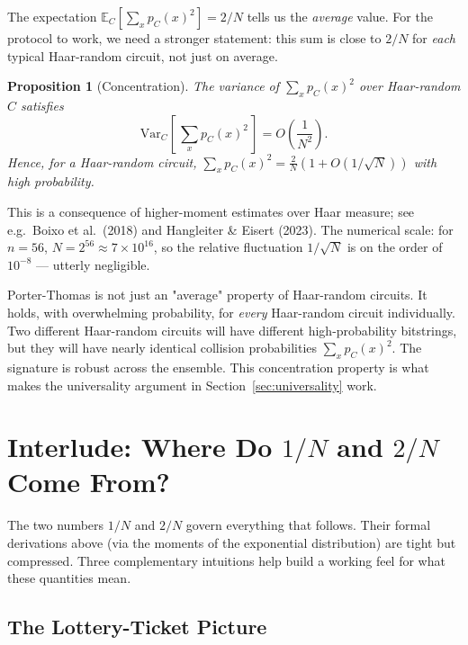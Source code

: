 \documentclass[11pt]{article}
\theoremstyle{plain}
\newtheorem{proposition}[theorem]{Proposition}
\theoremstyle{definition}
\newcommand{\E}{\mathbb{E}}
\newcommand{\Var}{\mathrm{Var}}
\begin{document}
The expectation $\E_C[\sum_x p_C(x)^2] = 2/N$ tells us the \emph{average} value. For the protocol to work, we need a stronger statement: this sum is close to $2/N$ for \emph{each} typical Haar-random circuit, not just on average.

\begin{proposition}[Concentration]
The variance of $\sum_x p_C(x)^2$ over Haar-random $C$ satisfies
\begin{equation}
\Var_C\!\left[\,\sum_x p_C(x)^2\,\right] = O\!\left(\frac{1}{N^2}\right).
\label{eq:sum-squared-var}
\end{equation}
Hence, for a Haar-random circuit, $\sum_x p_C(x)^2 = \frac{2}{N}(1 + O(1/\sqrt{N}))$ with high probability.
\end{proposition}

This is a consequence of higher-moment estimates over Haar measure; see e.g.\ Boixo et al.\ (2018) and Hangleiter \& Eisert (2023). The numerical scale: for $n=56$, $N = 2^{56} \approx 7 \times 10^{16}$, so the relative fluctuation $1/\sqrt{N}$ is on the order of $10^{-8}$ --- utterly negligible.

\begin{intuition}
Porter-Thomas is not just an "average" property of Haar-random circuits. It holds, with overwhelming probability, for \emph{every} Haar-random circuit individually. Two different Haar-random circuits will have different high-probability bitstrings, but they will have nearly identical collision probabilities $\sum_x p_C(x)^2$. The signature is robust across the ensemble. This concentration property is what makes the universality argument in Section~\ref{sec:universality} work.
\end{intuition}

\section{Interlude: Where Do $1/N$ and $2/N$ Come From?}

The two numbers $1/N$ and $2/N$ govern everything that follows. Their formal derivations above (via the moments of the exponential distribution) are tight but compressed. Three complementary intuitions help build a working feel for what these quantities mean.

\subsection{The Lottery-Ticket Picture}
\end{document}
